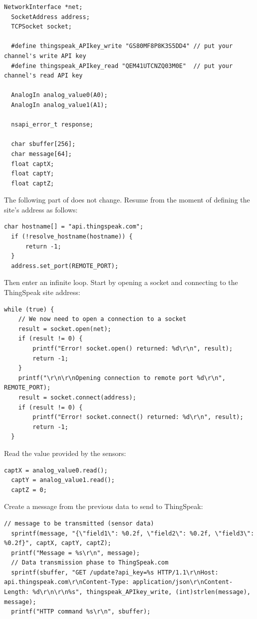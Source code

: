 \documentclass[10pt,a4paper,onecolumn]{article}
\let\textttOrig=\texttt
\def\texttt#1{\expandafter\textttOrig{\seqsplit{#1}}}
\begin{document}
\begin{lstlisting}[style=CStyle]
  NetworkInterface *net;
  SocketAddress address;
  TCPSocket socket;

  #define thingspeak_APIkey_write "GS80MF8P8K3S5DD4" // put your channel's write API key
  #define thingspeak_APIkey_read "QEM41UTCNZQ03M0E"  // put your channel's read API key

  AnalogIn analog_value0(A0);
  AnalogIn analog_value1(A1);

  nsapi_error_t response;

  char sbuffer[256];
  char message[64];
  float captX;
  float captY;
  float captZ;
\end{lstlisting}

The following part of \texttt{main.cpp} does not change. Resume from the
moment of defining the site's address as follows:

\begin{lstlisting}[style=CStyle]
  char hostname[] = "api.thingspeak.com";
  if (!resolve_hostname(hostname)) {
      return -1;
  }
  address.set_port(REMOTE_PORT);
\end{lstlisting}

Then enter an infinite loop. Start by opening a socket and connecting to
the ThingSpeak site address:

\begin{lstlisting}[style=CStyle]
  while (true) {
    // We now need to open a connection to a socket
    result = socket.open(net);
    if (result != 0) {
        printf("Error! socket.open() returned: %d\r\n", result);
        return -1;
    }
    printf("\r\n\r\nOpening connection to remote port %d\r\n", REMOTE_PORT);
    result = socket.connect(address);
    if (result != 0) {
        printf("Error! socket.connect() returned: %d\r\n", result);
        return -1;
  }
\end{lstlisting}

Read the value provided by the sensors:

\begin{lstlisting}[style=CStyle]
  captX = analog_value0.read();
  captY = analog_value1.read();
  captZ = 0;
\end{lstlisting}

Create a message from the previous data to send to ThingSpeak:

\begin{lstlisting}[style=CStyle]
  // message to be transmitted (sensor data)
  sprintf(message, "{\"field1\": %0.2f, \"field2\": %0.2f, \"field3\": %0.2f}", captX, captY, captZ);
  printf("Message = %s\r\n", message);
  // Data transmission phase to ThingSpeak.com
  sprintf(sbuffer, "GET /update?api_key=%s HTTP/1.1\r\nHost: api.thingspeak.com\r\nContent-Type: application/json\r\nContent-Length: %d\r\n\r\n%s", thingspeak_APIkey_write, (int)strlen(message), message);
  printf("HTTP command %s\r\n", sbuffer);
\end{lstlisting}
\end{document}
